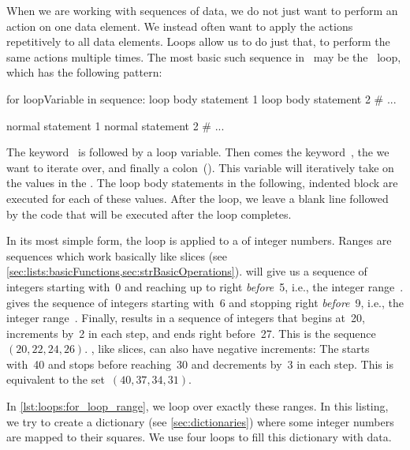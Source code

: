 %
%
When we are working with sequences of data, we do not just want to perform an action on one data element.
We instead often want to apply the actions repetitively to all data elements.
Loops allow us to do just that, to perform the same actions multiple times.%
%
%
%
%
%
The most basic such sequence in \python\ may be the ~loop, which has the following pattern:%
%
\begin{pythonSyntax}
for loopVariable in sequence:
    loop body statement 1
    loop body statement 2
    # ...

normal statement 1
normal statement 2
# ...
\end{pythonSyntax}
%
%
%
%
%
%
%
%
The keyword~ is followed by a loop variable.
Then comes the keyword~, the  we want to iterate over, and finally a colon~(\pythonilIdx{:}).
This variable will iteratively take on the values in the .
The loop body statements in the following, indented block are executed for each of these values.
After the loop, we leave a blank line followed by the code that will be executed after the loop completes.

In its most simple form, the  loop is applied to a  of integer numbers.
Ranges are sequences which work basically like slices (see \cref{sec:lists:basicFunctions,sec:strBasicOperations}).
 will give us a sequence of integers starting with~0 and reaching up to right \emph{before}~5, i.e., the integer range~.
 gives the sequence of integers starting with~6 and stopping right \emph{before}~9, i.e., the integer range~.
Finally,  results in a sequence of integers that begins at~20, increments by~2 in each step, and ends right before~27.
This is the sequence~$(20, 22, 24, 26)$.
, like slices, can also have negative increments:
The  starts with~40 and stops before reaching~30 and decrements by~3 in each step.
This is equivalent to the set~$(40, 37, 34, 31)$.

In \cref{lst:loops:for_loop_range}, we loop over exactly these ranges.
In this listing, we try to create a dictionary (see \cref{sec:dictionaries}) where some integer numbers are mapped to their squares.
We use four  loops to fill this dictionary with data.%
%
\endhsection%
%
\endhsection%
%
